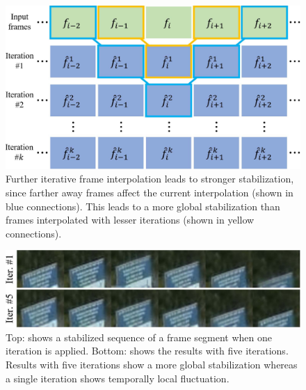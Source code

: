 \begin{figure}
	\includegraphics[width=1\linewidth,keepaspectratio]{iter}
	\caption{Further iterative frame interpolation leads to stronger stabilization, since farther away frames affect the current interpolation (shown in blue connections).
	This leads to a more global stabilization than frames interpolated with lesser iterations (shown in yellow connections).}
	\label{iter}
\end{figure}

\begin{figure}
	\includegraphics[width=1\linewidth,keepaspectratio]{iter_qual}
	\caption{Top: shows a stabilized sequence of a frame segment when one iteration is applied. Bottom: shows the results with five iterations. Results with five iterations show a more global stabilization whereas a single iteration shows temporally local fluctuation.}
	\label{iterqual}
\end{figure}

